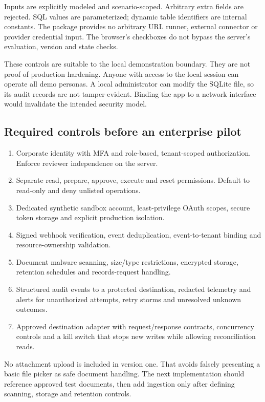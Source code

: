 \documentclass[11pt,letterpaper]{article}
\begin{document}
Inputs are explicitly modeled and scenario-scoped. Arbitrary extra fields are rejected. SQL values are parameterized; dynamic table identifiers are internal constants. The package provides no arbitrary URL runner, external connector or provider credential input. The browser's checkboxes do not bypass the server's evaluation, version and state checks.

These controls are suitable to the local demonstration boundary. They are not proof of production hardening. Anyone with access to the local session can operate all demo personas. A local administrator can modify the SQLite file, so its audit records are not tamper-evident. Binding the app to a network interface would invalidate the intended security model.

\subsection{Required controls before an enterprise pilot}
\begin{enumerate}
\item Corporate identity with MFA and role-based, tenant-scoped authorization. Enforce reviewer independence on the server.
\item Separate read, prepare, approve, execute and reset permissions. Default to read-only and deny unlisted operations.
\item Dedicated synthetic sandbox account, least-privilege OAuth scopes, secure token storage and explicit production isolation.
\item Signed webhook verification, event deduplication, event-to-tenant binding and resource-ownership validation.
\item Document malware scanning, size/type restrictions, encrypted storage, retention schedules and records-request handling.
\item Structured audit events to a protected destination, redacted telemetry and alerts for unauthorized attempts, retry storms and unresolved unknown outcomes.
\item Approved destination adapter with request/response contracts, concurrency controls and a kill switch that stops new writes while allowing reconciliation reads.
\end{enumerate}

No attachment upload is included in version one. That avoids falsely presenting a basic file picker as safe document handling. The next implementation should reference approved test documents, then add ingestion only after defining scanning, storage and retention controls.
\end{document}
